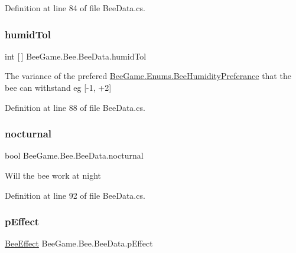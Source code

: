 Definition at line 84 of file Bee\+Data.\+cs.

\mbox{\label{struct_bee_game_1_1_bee_1_1_bee_data_a7d9953fe200dd4eb57a86db5fd7062e3}} 
\subsubsection{\texorpdfstring{humid\+Tol}{humidTol}}
{\footnotesize\ttfamily int \mbox{[}$\,$\mbox{]} Bee\+Game.\+Bee.\+Bee\+Data.\+humid\+Tol}



The variance of the prefered \hyperlink{namespace_bee_game_1_1_enums_a66566cbc9da8d1d1e402156b4bd3bf9d}{Bee\+Game.\+Enums.\+Bee\+Humidity\+Preferance} that the bee can withstand eg \mbox{[}-\/1, +2\mbox{]} 



Definition at line 88 of file Bee\+Data.\+cs.

\mbox{\label{struct_bee_game_1_1_bee_1_1_bee_data_a4cd90eee8d255726d982116f14b444b2}} 
\subsubsection{\texorpdfstring{nocturnal}{nocturnal}}
{\footnotesize\ttfamily bool Bee\+Game.\+Bee.\+Bee\+Data.\+nocturnal}



Will the bee work at night 



Definition at line 92 of file Bee\+Data.\+cs.

\mbox{\label{struct_bee_game_1_1_bee_1_1_bee_data_a652a963fb73f2a096a001d817c0ef2be}} 
\subsubsection{\texorpdfstring{p\+Effect}{pEffect}}
{\footnotesize\ttfamily \hyperlink{namespace_bee_game_1_1_enums_acf7ae32a86385a40fc0c7b55af95c6c3}{Bee\+Effect} Bee\+Game.\+Bee.\+Bee\+Data.\+p\+Effect}




